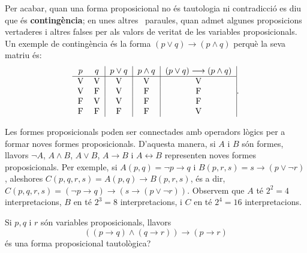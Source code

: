 Per acabar, quan una forma proposicional no és tautologia ni contradicció es diu que és \textbf{contingència}; en unes altres \
paraules, quan admet algunes proposicions vertaderes i altres falses per als
valors de veritat de les variables proposicionals. Un exemple de contingència és la forma $(p\vee q)\longrightarrow(p\wedge q)$ perquè la
seva matriu és:\begin{equation*}
\begin{tabular}{cc|c|c|c|}
$p$ & $q$ & $p\vee q$ & $p\wedge q$ & $(p\vee q)\longrightarrow(p\wedge q)$
\\ \hline
V & V & V & V & V \\
V & F & V & F & F \\
F & V & V & F & F \\
F & F & F & F & V\end{tabular}
\text{.}
\end{equation*}

\bigskip

Les formes proposicionals poden ser connectades amb operadors lògics per
a formar noves formes proposicionals. D'aquesta manera, si $A$ i $B$ són
formes, llavors $\lnot A$, $A\wedge B$, $A\vee B$, $A\longrightarrow B$ i $A\longleftrightarrow B$ representen noves formes proposicionals. Per
exemple, si $A(p,q)=\lnot p\longrightarrow q$ i $B(p,r,s)=s\longrightarrow\left( p\vee\lnot r\right) $, aleshores $C(p,q,r,s)=A(p,q)\longrightarrow
B(p,r,s)$, és a dir, $C(p,q,r,s)=\left( \lnot p\longrightarrow q\right)
\longrightarrow\left( s\longrightarrow\left( p\vee\lnot r\right) \right).$
Observem que $A$ té $2^{2}=4$ interpretacions, $B$ en té $2^{3}=8$
interpretacions, i $C$ en té $2^{4}=16$ interpretacions.

\begin{exemple}
Si $p,q$ i $r$ són variables proposicionals, llavors
\[
\left((p\longrightarrow q)\wedge(q\longrightarrow r)\right)
\longrightarrow(p\longrightarrow r)
\]
és una forma proposicional tautològica?
\end{exemple}

